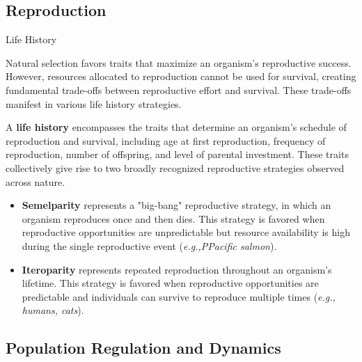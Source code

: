 \documentclass[10pt]{article}
\begin{document}
  \subsection{Reproduction}

    \begin{core}{Life History}
      
      Natural selection favors traits that maximize an organism's reproductive success. However, resources allocated to reproduction cannot be used for survival, creating fundamental trade-offs between reproductive effort and survival. These trade-offs manifest in various life history strategies.

      A \textbf{life history} encompasses the traits that determine an organism's schedule of reproduction and survival, including age at first reproduction, frequency of reproduction, number of offspring, and level of parental investment. These traits collectively give rise to two broadly recognized reproductive strategies observed across nature.

      \begin{itemize}

        \item \textbf{Semelparity} represents a "big-bang" reproductive strategy, in which an organism reproduces once and then dies. This strategy is favored when reproductive opportunities are unpredictable but resource availability is high during the single reproductive event (\textit{e.g.,PPacific salmon}).

        \item \textbf{Iteroparity} represents repeated reproduction throughout an organism's lifetime. This strategy is favored when reproductive opportunities are predictable and individuals can survive to reproduce multiple times (\textit{e.g., humans, cats}).

      \end{itemize}

    \end{core}
    
  \subsection{Population Regulation and Dynamics}
\end{document}
